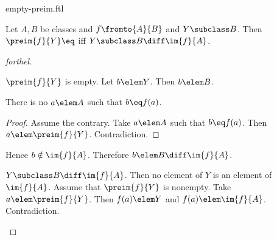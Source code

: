 \documentclass{naproche-library}
\begin{document}
\begin{smodule}[title=Empty Preimages]{empty-preim.ftl}


\begin{proposition}[forthel,id=EmptyPreimProp]
  Let $A, B$ be classes and $f \fromto{A}{B}$ and $Y \subclass B$.
  Then $\preim{f}{Y} \eq \empty$ iff $Y \subclass B \diff \im{f}{A}$.
\end{proposition}
\begin{proof}[forthel]
  \begin{case}{$\preim{f}{Y}$ is empty.}
    Let $b \elem Y$.
    Then $b \elem B$.

    There is no $a \elem A$ such that $b \eq f(a)$.
    \begin{proof}
      Assume the contrary.
      Take $a \elem A$ such that $b \eq f(a)$.
      Then $a \elem \preim{f}{Y}$.
      Contradiction.
    \end{proof}

    Hence $b \notin \im{f}{A}$.
    Therefore $b \elem B \diff \im{f}{A}$.
  \end{case}

  \begin{case}{$Y \subclass B \diff \im{f}{A}$.}
    Then no element of $Y$ is an element of $\im{f}{A}$.
    Assume that $\preim{f}{Y}$ is nonempty.
    Take $a \elem \preim{f}{Y}$.
    Then $f(a) \elem Y$ and $f(a) \elem \im{f}{A}$.
    Contradiction.
  \end{case}
\end{proof}

\end{smodule}
\end{document}
